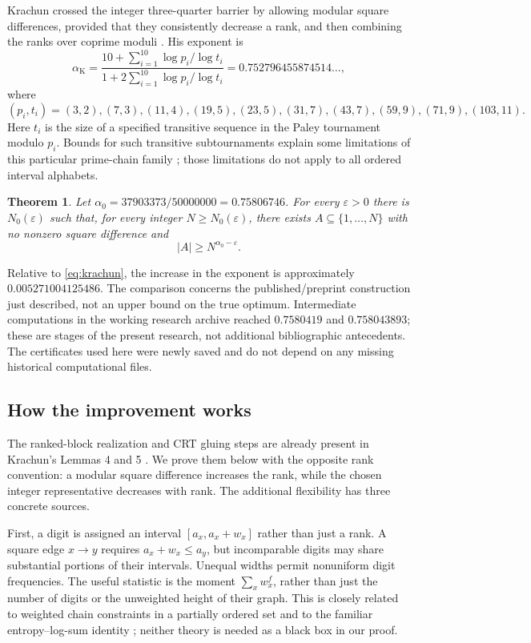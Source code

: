 \documentclass[11pt]{article}
\newtheorem{theorem}{Theorem}[section]
\theoremstyle{definition}
\theoremstyle{remark}
\newcommand{\al}{\alpha_0}
\newcommand{\card}[1]{\lvert #1\rvert}
\begin{document}
Krachun crossed the integer three-quarter barrier by allowing modular square differences, provided
that they consistently decrease a rank, and then combining the ranks over
coprime moduli \cite{Krachun2026}. His exponent is
\begin{equation}\label{eq:krachun}
 \alpha_{\mathrm K}=
 \frac{10+\sum_{i=1}^{10}\log p_i/\log t_i}
      {1+2\sum_{i=1}^{10}\log p_i/\log t_i}
 =0.752796455874514\ldots,
\end{equation}
where
\[
 (p_i,t_i)=(3,2),(7,3),(11,4),(19,5),(23,5),
 (31,7),(43,7),(59,9),(71,9),(103,11).
\]
Here $t_i$ is the size of a specified transitive sequence in the Paley
tournament modulo $p_i$. Bounds for such transitive subtournaments explain
some limitations of this particular prime-chain family
\cite{Satake2021,Krachun2026}; those limitations do not apply to all ordered
interval alphabets.

\begin{theorem}\label{thm:main}
Let $\al=37903373/50000000=0.75806746$. For every $\varepsilon>0$ there is
$N_0(\varepsilon)$ such that, for every integer $N\ge N_0(\varepsilon)$,
there exists $A\subseteq\{1,\ldots,N\}$ with no nonzero square difference and
\[
 \card A\ge N^{\al-\varepsilon}.
\]
\end{theorem}

Relative to \eqref{eq:krachun}, the increase in the exponent is approximately
$0.005271004125486$. The comparison concerns the published/preprint
construction just described, not an upper bound on the true optimum.
Intermediate computations in the working research archive reached
$0.7580419$ and $0.758043893$; these are stages of the present research,
not additional bibliographic antecedents. The certificates used here were
newly saved and do not depend on any missing historical computational files.

\subsection{How the improvement works}
The ranked-block realization and CRT gluing steps are already present in
Krachun's Lemmas 4 and 5 \cite{Krachun2026}. We prove them below with the
opposite rank convention: a modular square difference increases the rank,
while the chosen integer representative decreases with rank.
The additional flexibility has three concrete sources.

First, a digit is assigned an interval $[a_x,a_x+w_x]$ rather than just a
rank. A square edge $x\to y$ requires $a_x+w_x\le a_y$, but incomparable
digits may share substantial portions of their intervals. Unequal widths
permit nonuniform digit frequencies. The useful statistic is the moment
$\sum_xw_x^f$, rather than just the number of digits or the unweighted
height of their graph. This is closely related to weighted chain constraints
in a partially ordered set \cite{Stanley1986} and to the familiar
entropy--log-sum identity \cite{CoverThomas2006}; neither theory is needed
as a black box in our proof.
\end{document}

